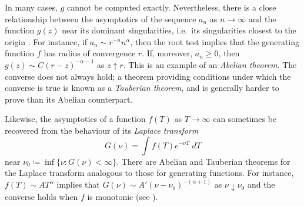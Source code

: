 In many cases, $g$ cannot be computed exactly. Nevertheless, there is a close
relationship between the asymptotics of the sequence $a_n$
as $n\to\infty$ and the function $g(z)$ near its dominant singularities, i.e.\
its singularities closest to the origin \cite{FS09}.
For instance, if $a_n \sim r^{-n} n^\alpha$, then the root test implies that
the generating function $f$ has radius of convergence $r$. If, moreover, $a_n \ge 0$,
then $g(z) \sim C (r - z)^{-\alpha-1}$ as $z \uparrow r$.		%
This is an
example of an \emph{Abelian theorem}. The converse does not always hold; a
theorem providing conditions under which the converse is true is known as a
\emph{Tauberian theorem}, and is generally harder to prove than its Abelian
counterpart.

Likewise, the asymptotics of a function $f(T)$ as $T\to\infty$ can sometimes
be recovered from the behaviour of its \emph{Laplace transform}
\begin{equation}
\label{e:laplace-transform-def}
G(\nu) = \int f(T) e^{-\nu T} \; dT
\end{equation}
near $\nu_0 \coloneqq \inf \{ \nu : G(\nu) < \infty \}$.
There are Abelian and Tauberian theorems for the Laplace transform analogous
to those for generating functions. For instance,
$f(T) \sim A T^\alpha$ implies that $G(\nu) \sim A' (\nu - \nu_0)^{-(\alpha+1)}$
as $\nu\downarrow\nu_0$ and the converse holds when $f$ is monotonic (see \cite{Widd41}).



% 
% 

